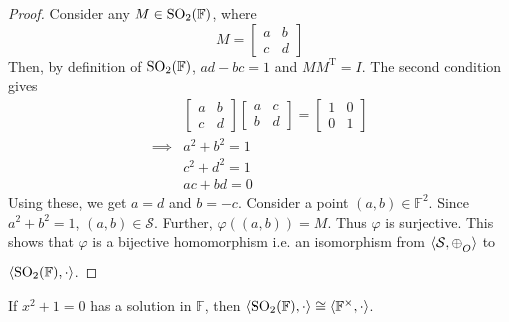 \begin{proof}
    \noindent
    Consider any $M\in\mathrm{SO}_{2}(\mathbb{F})$, where
    \[ M = \begin{bmatrix}a & b \\ c & d\end{bmatrix} \]
    Then, by definition of $\mathrm{SO}_{2}(\mathbb{F})$, $ad-bc=1$ and
    $MM^\mathrm{T}=I$. The second condition gives
    \begin{align*}
        & \begin{bmatrix}a & b \\ c & d\end{bmatrix} \begin{bmatrix}a & c \\ b & d\end{bmatrix} = \begin{bmatrix}1 & 0 \\ 0 & 1\end{bmatrix} \\
        \implies& a^2 + b^2 = 1 \\
                & c^2 + d^2 = 1 \\
                & ac + bd = 0
    \end{align*}
    Using these, we get $a=d$ and $b=-c$. Consider a point $(a,b)\in\mathbb{F}^2$.
    Since $a^2+b^2=1$, $(a,b)\in\mathcal{S}$. Further, $\varphi((a,b))=M$.
    Thus $\varphi$ is surjective. This shows that $\varphi$ is a bijective
    homomorphism i.e. an isomorphism from $\langle \mathcal{S},\conop \rangle$ to
    $\langle \mathrm{SO}_{2}(\mathbb{F}),\cdot \rangle$.
\end{proof}

\begin{theorem} \label{thm:hyp_ell_corr}
    If $x^2+1=0$ has a solution in $\mathbb{F}$, then
    $\langle\mathrm{SO}_{2}(\mathbb{F}),\cdot\rangle \cong \langle\mathbb{F}^\times,\cdot\rangle$.
\end{theorem}

